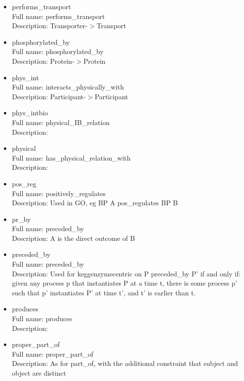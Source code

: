 \begin{itemize}
\item{performs\_transport}\\ Full name: performs\_transport\\ Description: Transporter-$>$Transport 

\item{phosphorylated\_by}\\ Full name: phosphorylated\_by\\ Description: Protein-$>$Protein 

\item{phys\_int}\\ Full name: interacts\_physically\_with\\ Description: Participant-$>$Participant 

\item{phys\_intbio}\\ Full name: physical\_IB\_relation\\ Description: 

\item{physical}\\ Full name: has\_physical\_relation\_with\\ Description: 

\item{pos\_reg}\\ Full name: positively\_regulates\\ Description: Used in GO, eg BP A pos\_regulates BP B 

\item{pr\_by}\\ Full name: preceded\_by\\ Description: A is the direct outcome of B 

\item{preceded\_by}\\ Full name: preceded\_by\\ Description: Used for keggenzymecentric on P preceded\_by P' if and only if: given any process p that instantiates P at a time t, there is some process p' such that p' instantiates P' at time t', and t' is earlier than t. 

\item{produces}\\ Full name: produces\\ Description: 

\item{proper\_part\_of}\\ Full name: proper\_part\_of\\ Description: As for part\_of, with the additional constraint that subject and object are distinct 


\end{itemize}
